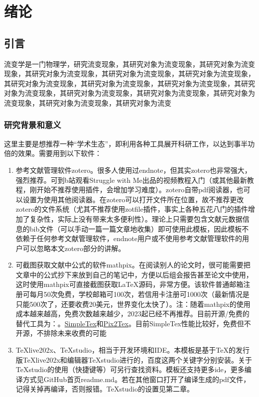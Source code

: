 \chapter{绪论}

\section{引言}

流变学是一门物理学，研究流变现象，其研究对象为流变现象，其研究对象为流变现象，其研究对象为流变现象，其研究对象为流变现象，其研究对象为流变现象，其研究对象为流变现象，其研究对象为流变现象，其研究对象为流变现象，其研究对象为流变现象，其研究对象为流变现象，其研究对象为流变现象，其研究对象为流变现象，其研究对象为流变现象，其研究对象为流变

\subsection{研究背景和意义}

这里主要是想推荐一种“学术生态”，即利用各种工具展开科研工作，以达到事半功倍的效果。需要用到以下软件：
\begin{enumerate}[topsep = 0 pt, itemsep= 0 pt, parsep=0pt, partopsep=0pt, leftmargin=44pt, itemindent=0pt, labelsep=6pt, label=(\arabic*)]
	\item 	参考文献管理软件zotero\cite{_m}。很多人使用过endnote，但其实zotero也非常强大，强烈推荐。可到b站观看Struggle with Me出品的视频教程\cite{_k}入门（或其他最新教程，刚开始不推荐使用插件，会增加学习难度）。zotero自带pdf阅读器，也可以设置为使用其他阅读器。在zotero可以打开文件所在位置，故不推荐更改zotero的文件系统（尤其不推荐使用zotfile插件，事实上各种五花八门的插件增加了复杂性，实际上没有带来太多便利性）。理论上只需要包含文献元数据信息的bib文件（可以手动一篇一篇文章地收集）即可使用此模板，因此模板不依赖于任何参考文献管理软件，endnote用户或不使用参考文献管理软件的用户可以忽略本文zotero部分的讲解。
	\item	可截图获取文献中公式的软件mathpix\cite{_h}。在阅读别人的论文时，很可能需要把文章中的公式抄下来放到自己的笔记中，方便以后组会报告甚至论文中使用，这时使用mathpix可直接截图获取\LaTeX{}源码，非常方便。该软件普通邮箱注册可每月50次免费，学校邮箱可100次，若信用卡注册可1000次（最新情况是只能500次了，还要收费20美元，世界变化太快了）。注：随着mathpix的使用成本越来越高，免费次数越来越少，2023起已经不再推荐。目前开源/免费的替代工具为：。\href{https://www.simpletex.cn/}{SimpleTex}和\href{https://p2t.breezedeus.com/}{Pix2Tex}。目前SimpleTex性能比较好，免费但不开源，不排除未来收费的可能
	\item	TeXlive202x、TeXstudio，相当于开发环境和IDE。本模板是基于TeX的发行版TeXlive202x和编辑器TeXstudio进行的，百度这两个关键字分别安装。关于TeXstudio的使用（快捷键等）可另行查找资料。模板还支持更多ide，更多编译方式见GitHub首页readme.md。若在其他窗口打开了编译生成的pdf文件，记得关掉再编译，否则报错。TeXstudio的设置见第二章。
\end{enumerate}


